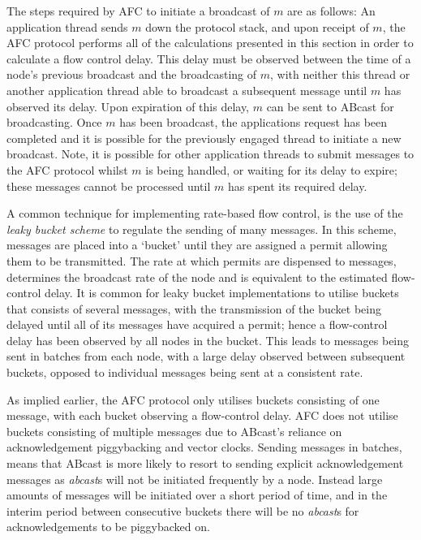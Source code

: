      The steps required by AFC to initiate a broadcast of $m$ are as follows: An application thread sends $m$ down the protocol stack, and upon receipt of $m$, the AFC protocol performs all of the calculations presented in this section in order to calculate a flow control delay.  This delay must be observed between the time of a node's previous broadcast and the broadcasting of $m$, with neither this thread or another application thread able to broadcast a subsequent message until $m$ has observed its delay.  Upon expiration of this delay, $m$ can be sent to \textsf{ABcast} for broadcasting.  Once $m$ has been broadcast, the applications request has been completed and it is possible for the previously engaged thread to initiate a new broadcast.  Note, it is possible for other application threads to submit messages to the AFC protocol whilst $m$ is being handled, or waiting for its delay to expire; these messages cannot be processed until $m$ has spent its required delay. 
        
    A common technique for implementing rate-based flow control, is the use of the \emph{leaky bucket scheme} \citep{Jain:1996:CCT:244118.244120, bertsekas1992DataNetworksFC} to regulate the sending of many messages.  In this scheme, messages are placed into a \textquoteleft{}bucket' until they are assigned a permit allowing them to be transmitted.  The rate at which permits are dispensed to messages, determines the broadcast rate of the node and is equivalent to the estimated flow-control delay.  It is common for  leaky bucket implementations to utilise buckets that consists of several messages, with the transmission of the bucket being delayed until all of its messages have acquired a permit; hence a flow-control delay has been observed by all nodes in the bucket.  This leads to messages being sent in batches from each node, with a large delay observed between subsequent buckets, opposed to individual messages being sent at a consistent rate.  
    
    As implied earlier, the AFC protocol only utilises buckets consisting of one message, with each bucket observing a flow-control delay.  AFC does not utilise buckets consisting of multiple messages due to \textsf{ABcast}'s reliance on acknowledgement piggybacking and vector clocks.  Sending messages in batches, means that \textsf{ABcast} is more likely to resort to sending explicit acknowledgement messages as \emph{abcast}s will not be initiated frequently by a node.  Instead large amounts of messages will be initiated over a short period of time, and in the interim period between consecutive buckets there will be no \emph{abcast}s for acknowledgements to be piggybacked on.  
    
